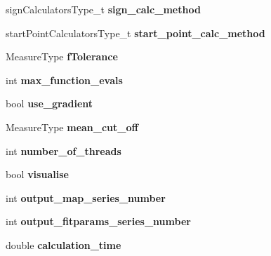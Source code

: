 \begin{DoxyCompactItemize}
\item 
\hypertarget{struct_ox_1_1_tomato_options_a2cf923d6d04fb8cb510db2623e93119d}{sign\-Calculators\-Type\-\_\-t {\bfseries sign\-\_\-calc\-\_\-method}}\label{struct_ox_1_1_tomato_options_a2cf923d6d04fb8cb510db2623e93119d}

\item 
\hypertarget{struct_ox_1_1_tomato_options_a9da2993961d10c848b0860284900c869}{start\-Point\-Calculators\-Type\-\_\-t {\bfseries start\-\_\-point\-\_\-calc\-\_\-method}}\label{struct_ox_1_1_tomato_options_a9da2993961d10c848b0860284900c869}

\item 
\hypertarget{struct_ox_1_1_tomato_options_ae2ac4c46e46b4d183c6944771701040b}{Measure\-Type {\bfseries f\-Tolerance}}\label{struct_ox_1_1_tomato_options_ae2ac4c46e46b4d183c6944771701040b}

\item 
\hypertarget{struct_ox_1_1_tomato_options_a9b864c01b6b0b4e4d5a56470f6c5f004}{int {\bfseries max\-\_\-function\-\_\-evals}}\label{struct_ox_1_1_tomato_options_a9b864c01b6b0b4e4d5a56470f6c5f004}

\item 
\hypertarget{struct_ox_1_1_tomato_options_a367c540e5413f8ffa3a6bc6ef5781b45}{bool {\bfseries use\-\_\-gradient}}\label{struct_ox_1_1_tomato_options_a367c540e5413f8ffa3a6bc6ef5781b45}

\item 
\hypertarget{struct_ox_1_1_tomato_options_af81d1a55409036109d253b313d59e972}{Measure\-Type {\bfseries mean\-\_\-cut\-\_\-off}}\label{struct_ox_1_1_tomato_options_af81d1a55409036109d253b313d59e972}

\item 
\hypertarget{struct_ox_1_1_tomato_options_a54efb4945f2857ee4ed9e1d5552fc3dd}{int {\bfseries number\-\_\-of\-\_\-threads}}\label{struct_ox_1_1_tomato_options_a54efb4945f2857ee4ed9e1d5552fc3dd}

\item 
\hypertarget{struct_ox_1_1_tomato_options_a043a4cf0e29a4482406e95f27ab2f860}{bool {\bfseries visualise}}\label{struct_ox_1_1_tomato_options_a043a4cf0e29a4482406e95f27ab2f860}

\item 
\hypertarget{struct_ox_1_1_tomato_options_ab20a779c5a8dd371ec9356e3f9ce79c9}{int {\bfseries output\-\_\-map\-\_\-series\-\_\-number}}\label{struct_ox_1_1_tomato_options_ab20a779c5a8dd371ec9356e3f9ce79c9}

\item 
\hypertarget{struct_ox_1_1_tomato_options_a58664e816cde6eff746bd5abe4fe2d1c}{int {\bfseries output\-\_\-fitparams\-\_\-series\-\_\-number}}\label{struct_ox_1_1_tomato_options_a58664e816cde6eff746bd5abe4fe2d1c}

\item 
\hypertarget{struct_ox_1_1_tomato_options_a008c932c7d65248d2d82e0e654993384}{double {\bfseries calculation\-\_\-time}}\label{struct_ox_1_1_tomato_options_a008c932c7d65248d2d82e0e654993384}

\end{DoxyCompactItemize}


